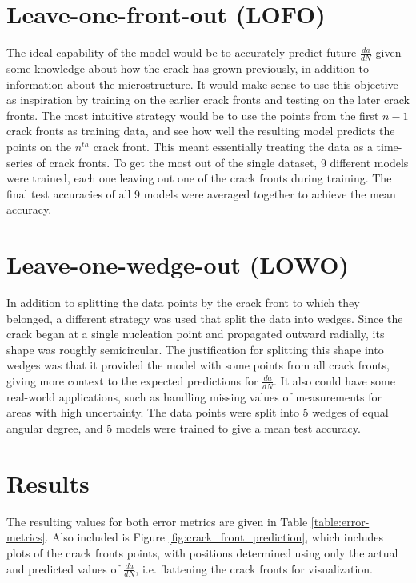 \section{Leave-one-front-out (LOFO)}
The ideal capability of the model would be to accurately predict future $\frac{da}{dN}$ given some knowledge about how the crack has grown previously, in addition to information about the microstructure.  It would make sense to use this objective as inspiration by training on the earlier crack fronts and testing on the later crack fronts.  The most intuitive strategy would be to use the points from the first $n-1$ crack fronts as training data, and see how well the resulting model predicts the points on the $n^{th}$ crack front.  This meant essentially treating the data as a time-series of crack fronts.  To get the most out of the single dataset, 9 different models were trained, each one leaving out one of the crack fronts during training.  The final test accuracies of all 9 models were averaged together to achieve the mean accuracy.

\section{Leave-one-wedge-out (LOWO)}
In addition to splitting the data points by the crack front to which they belonged, a different strategy was used that split the data into wedges.  Since the crack began at a single nucleation point and propagated outward radially, its shape was roughly semicircular.  The justification for splitting this shape into wedges was that it provided the model with some points from all crack fronts, giving more context to the expected predictions for $\frac{da}{dN}$.  It also could have some real-world applications, such as handling missing values of measurements for areas with high uncertainty.  The data points were split into 5 wedges of equal angular degree, and 5 models were trained to give a mean test accuracy.

\section{Results}
The resulting values for both error metrics are given in Table \ref{table:error-metrics}.  Also included is Figure \ref{fig:crack_front_prediction}, which includes plots of the crack fronts points, with positions determined using only the actual and predicted values of $\frac{da}{dN}$, i.e. flattening the crack fronts for visualization.


